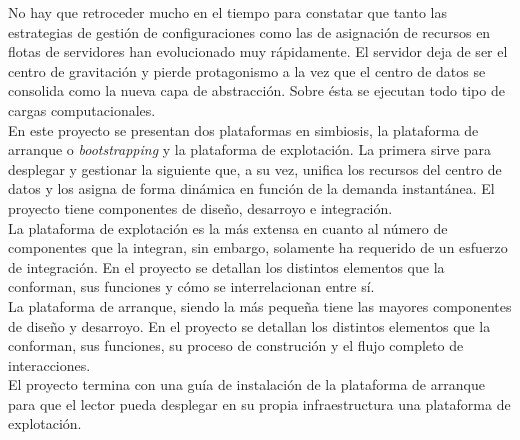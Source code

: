 \documentclass[a4paper,12pt,spanish,final]{epsc_tfc_pfc}
\begin{document}
\pagestyle{empty}
\portada{}


\begin{resum}{1cm}
No hay que retroceder mucho en el tiempo para constatar que tanto las estrategias de gestión de configuraciones como las de asignación de recursos en flotas de servidores han evolucionado muy rápidamente. El servidor deja de ser el centro de gravitación y pierde protagonismo a la vez que el centro de datos se consolida como la nueva capa de abstracción. Sobre ésta se ejecutan todo tipo de cargas computacionales.\\

En este proyecto se presentan dos plataformas en simbiosis, la plataforma de arranque o \emph{bootstrapping} y la plataforma de explotación. La primera sirve para desplegar y gestionar la siguiente que, a su vez, unifica los recursos del centro de datos y los asigna de forma dinámica en función de la demanda instantánea. El proyecto tiene componentes de diseño, desarroyo e integración.\\

La plataforma de explotación es la más extensa en cuanto al número de componentes que la integran, sin embargo, solamente ha requerido de un esfuerzo de integración. En el proyecto se detallan los distintos elementos que la conforman, sus funciones y cómo se interrelacionan entre sí.\\

La plataforma de arranque, siendo la más pequeña tiene las mayores componentes de diseño y desarroyo. En el proyecto se detallan los distintos elementos que la conforman, sus funciones, su proceso de construción y el flujo completo de interacciones.\\

El proyecto termina con una guía de instalación de la plataforma de arranque para que el lector pueda desplegar en su propia infraestructura una plataforma de explotación.
\end{resum}

\end{document}
